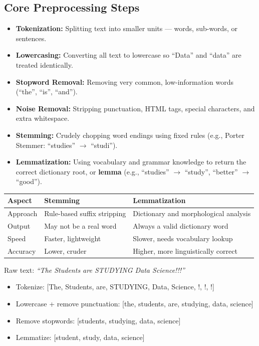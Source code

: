 \documentclass[11pt,a4paper]{article}
\begin{document}
\subsection{Core Preprocessing Steps}
\begin{itemize}[leftmargin=*]
  \item \textbf{Tokenization:} Splitting text into smaller units --- words, sub-words, or sentences.
  \item \textbf{Lowercasing:} Converting all text to lowercase so ``Data'' and ``data'' are treated identically.
  \item \textbf{Stopword Removal:} Removing very common, low-information words (``the'', ``is'', ``and'').
  \item \textbf{Noise Removal:} Stripping punctuation, HTML tags, special characters, and extra whitespace.
  \item \textbf{Stemming:} Crudely chopping word endings using fixed rules (e.g., Porter Stemmer: ``studies'' $\to$ ``studi'').
  \item \textbf{Lemmatization:} Using vocabulary and grammar knowledge to return the correct dictionary root, or \textbf{lemma} (e.g., ``studies'' $\to$ ``study'', ``better'' $\to$ ``good'').
\end{itemize}

\begin{center}
\begin{tabular}{@{}p{2.6cm}p{5.3cm}p{5.3cm}@{}}
\toprule
\rowcolor{primary!15}
\textbf{Aspect} & \textbf{Stemming} & \textbf{Lemmatization} \\
\midrule
Approach & Rule-based suffix stripping & Dictionary and morphological analysis \\
Output & May not be a real word & Always a valid dictionary word \\
Speed & Faster, lightweight & Slower, needs vocabulary lookup \\
Accuracy & Lower, cruder & Higher, more linguistically correct \\
\bottomrule
\end{tabular}
\end{center}

\begin{examplebox}
Raw text: \textit{``The Students are STUDYING Data Science!!!''}
\begin{itemize}[leftmargin=*]
  \item Tokenize: [The, Students, are, STUDYING, Data, Science, !, !, !]
  \item Lowercase + remove punctuation: [the, students, are, studying, data, science]
  \item Remove stopwords: [students, studying, data, science]
  \item Lemmatize: [student, study, data, science]
\end{itemize}
\end{examplebox}
\end{document}
